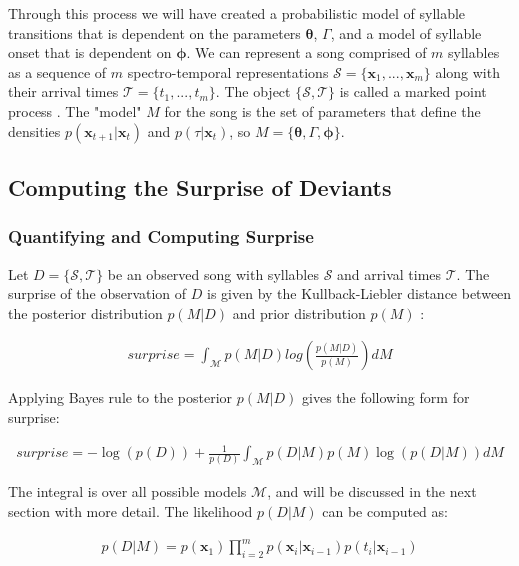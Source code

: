 Through this process we will have created a probabilistic model of syllable transitions that is dependent on the
parameters $\bm{\theta}$, $\Gamma$, and a model of syllable onset that is dependent on $\bm{\phi}$. We can
represent a song comprised of $m$ syllables as a sequence of $m$ spectro-temporal representations
$\mathcal{S} = \{ \bm{x}_1, ..., \bm{x}_m \}$ along with their arrival times $\mathcal{T} = \{ t_1, ..., t_m \}$.
The object $\{ \mathcal{S}, \mathcal{T} \}$ is called a marked point process \cite{Snyder1991}.
The "model" $M$ for the song is the set of parameters that define the densities
$p \left( \bm{x}_{t+1} | \bm{x}_{t} \right)$ and $p \left( \tau | \bm{x}_t \right)$, so
$M = \{ \bm{\theta}, \Gamma, \bm{\phi} \}$.


\subsection{Computing the Surprise of Deviants}

\subsubsection{Quantifying and Computing Surprise}
\label{sec:surprise}

Let $D = \{ \mathcal{S}, \mathcal{T} \}$ be an observed song with syllables $\mathcal{S}$ and arrival
times $\mathcal{T}$. The surprise of the observation of $D$ is given by the
Kullback-Liebler distance between the posterior distribution $p(M|D)$ and prior
distribution $p(M)$ \cite{Itti2009}:

\begin{align}
surprise = \int_\mathcal{M} p(M|D) log \left( \frac{p(M | D)}{p(M)} \right) dM \label{eq_surprise1}
\end{align}

Applying Bayes rule to the posterior $p(M|D)$ gives the following form for surprise:

\begin{align}
surprise = -\log \left( p(D) \right) + \frac{1}{p(D)} \int_\mathcal{M} p(D|M) p(M) \log \left( p(D | M) \right) dM \label{eq_surprise2}
\end{align}

The integral is over all possible models $\mathcal{M}$, and will be discussed in the next section with
more detail. The likelihood $p(D|M)$ can be computed as:

\begin{align}
p(D|M) = p(\bm{x}_1) \prod_{i=2}^m p\left( \bm{x}_i | \bm{x}_{i-1} \right) p\left( t_i | \bm{x}_{i-1} \right)
\end{align}

